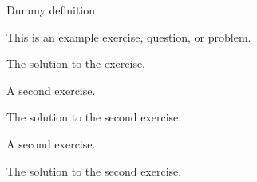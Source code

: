 \begin{definition}
Dummy definition
\end{definition}

\begin{exercise}
    This is an example exercise, question, or problem.
\end{exercise}

\begin{solution}
    The solution to the exercise.
\end{solution}


\begin{exercise}
    A second exercise.
\end{exercise}

\begin{solution}
    The solution to the second exercise.
\end{solution}


\begin{exercise}
    A second exercise.
\end{exercise}

\begin{solution}
    The solution to the second exercise.
\end{solution}
